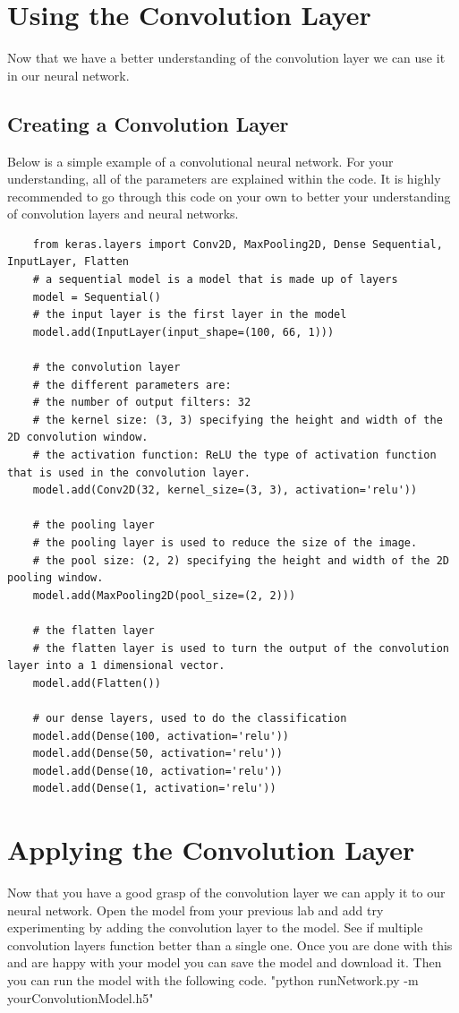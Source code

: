 \documentclass[11pt]{report}
\begin{document}
\clearpage

\chapter{Using the Convolution Layer}
Now that we have a better understanding of the convolution layer we can use it in our neural network.
\section{Creating a Convolution Layer}
Below is a simple example of a convolutional neural network. For your understanding, all of the parameters are explained within the code. It is highly recommended to go through this code on your own to better your understanding of convolution layers and neural networks.
\begin{verbatim} 
    from keras.layers import Conv2D, MaxPooling2D, Dense Sequential, InputLayer, Flatten
    # a sequential model is a model that is made up of layers
    model = Sequential()
    # the input layer is the first layer in the model
    model.add(InputLayer(input_shape=(100, 66, 1)))

    # the convolution layer
    # the different parameters are:
    # the number of output filters: 32
    # the kernel size: (3, 3) specifying the height and width of the 2D convolution window.
    # the activation function: ReLU the type of activation function that is used in the convolution layer.
    model.add(Conv2D(32, kernel_size=(3, 3), activation='relu'))

    # the pooling layer
    # the pooling layer is used to reduce the size of the image.
    # the pool size: (2, 2) specifying the height and width of the 2D pooling window.
    model.add(MaxPooling2D(pool_size=(2, 2)))

    # the flatten layer
    # the flatten layer is used to turn the output of the convolution layer into a 1 dimensional vector.
    model.add(Flatten())

    # our dense layers, used to do the classification
    model.add(Dense(100, activation='relu'))
    model.add(Dense(50, activation='relu'))
    model.add(Dense(10, activation='relu'))
    model.add(Dense(1, activation='relu'))
\end{verbatim}

\chapter{Applying the Convolution Layer}
Now that you have a good grasp of the convolution layer we can apply it to our neural network. Open the model from your previous lab and add try experimenting by adding the convolution layer to the model. See if multiple convolution layers function better than a single one. Once you are done with this and are happy with your model you can save the model and download it. Then you can run the model with the following code.
"python runNetwork.py -m yourConvolutionModel.h5"
\end{document}
